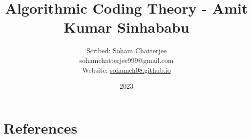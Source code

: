 \documentclass{book}
\title{\huge Algorithmic Coding Theory - Amit Kumar Sinhababu}
\author{ \vspace*{5mm} \LARGE Scribed: Soham Chatterjee\\\large sohamchatterjee999@gmail.com\\ \large Website: \href{https://sohamch08.github.io/}{sohamch08.github.io}}
\date{\LARGE 2023}
\begin{document}
\begin{titlingpage}
	\maketitle
\end{titlingpage}
	
\pagebreak
\tableofcontents 
\pagebreak







\pagebreak
\chapter{References}
\printbibliography[heading=none]
%
%
\end{document}
